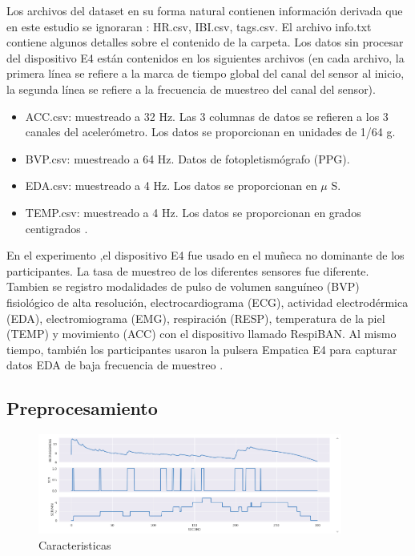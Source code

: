 Los archivos del dataset  en su forma natural contienen  información derivada  que en  este estudio se ignoraran : HR.csv, IBI.csv, tags.csv. El archivo info.txt contiene algunos detalles sobre el contenido de la carpeta. Los datos sin procesar del dispositivo E4 están contenidos en los siguientes archivos (en cada archivo, la primera línea se refiere a la marca de tiempo global del canal del sensor al inicio, la segunda línea se refiere a la frecuencia de muestreo del canal del sensor).

\begin{itemize}
    \item ACC.csv: muestreado a 32 Hz. Las 3 columnas de datos se refieren a los 3 canales del acelerómetro. Los datos se proporcionan en unidades de 1/64 g.
    \item BVP.csv: muestreado a 64 Hz. Datos de fotopletismógrafo (PPG).
    \item EDA.csv: muestreado a 4 Hz. Los datos se proporcionan en $\mu$ S.
    \item TEMP.csv: muestreado a 4 Hz. Los datos se proporcionan en grados centigrados .
\end{itemize}

En el experimento ,el dispositivo E4 fue usado en el 
muñeca no dominante de los participantes. La tasa de muestreo de los diferentes sensores fue diferente.
Tambien se registro modalidades de pulso de volumen sanguíneo (BVP) fisiológico de alta resolución, electrocardiograma (ECG), actividad electrodérmica (EDA), electromiograma (EMG), respiración (RESP), temperatura de la piel (TEMP) y movimiento (ACC) con el dispositivo  llamado RespiBAN. Al mismo tiempo, también los participantes usaron la  pulsera Empatica E4 para capturar datos EDA de baja frecuencia de muestreo . 





\subsection{Preprocesamiento}
\begin{figure}
    \centering
    \includegraphics[width=10cm]{Graficos/captura2.png}
    \caption{Caracteristicas}
    \label{fig:enter-label}
\end{figure}


